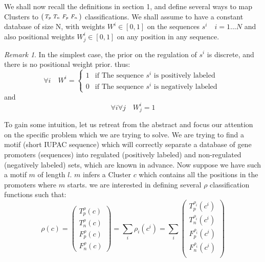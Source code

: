 \documentclass{amsart}
\theoremstyle{definition}
\theoremstyle{remark}
\theoremstyle{definition}
\theoremstyle{remark}
\newtheorem* {scoreremark}{Remark}
\begin{document}
We shall now recall the definitions in section 1, and define several ways to
map Clusters to $\left(\begin{smallmatrix} T_p & T_n & F_p & F_n \end{smallmatrix}\right)$ classifications.
We shall assume to have a constant database of size N, with 
weights $W^i\in[0,1]$ on the sequences $s^i \quad i=1...N$ and also 
positional weights $W^i_j \in [0,1]$ on any position in any sequence.

\begin {scoreremark}
In the simplest case, the prior on the regulation of $s^i$ is discrete, 
and there is no positional weight prior. thus: 
\begin{equation*}
	\forall i \quad W^i =	\begin{cases}
										1 & \text{if The sequence $s^i$ is positively labeled } \\
										0 & \text{if The sequence $s^i$ is negatively labeled } 
									\end{cases} 
\end{equation*}
and 
\begin{equation*}
	\forall i \forall j \quad W^i_j = 1
\end{equation*}
\end{scoreremark}
To gain some intuition, let us retreat from the abstract and
focus our attention on the specific problem which we are trying to solve.
We are trying to find a motif (short IUPAC sequence) which will correctly separate
a database of gene promoters (sequences) into regulated (positively labeled)
and non-regulated (negatively labeled) sets, which are known in advance.
Now suppose we have such a motif $m$ of length $l$.
$m$ infers a Cluster $c$ which contains all the positions
in the promoters where $m$ starts.
we are interested in defining several $\rho$ classification functions such that: 
\begin{equation*}
	\rho (c) = \begin{pmatrix}
						T^{\rho}_p (c) \\
						T^{\rho}_n (c) \\
						F^{\rho}_p (c) \\
						F^{\rho}_n (c)
					\end{pmatrix} 
				= \sum_i \rho_i(c^i) 
				= \sum_i \begin{pmatrix}
								 T^{\rho_i}_p (c^i) \\
								 T^{\rho_i}_n (c^i) \\
								 F^{\rho_i}_p (c^i) \\
								 F^{\rho_i}_n (c^i) \\
								\end{pmatrix}
\end{equation*}		
\end{document}
